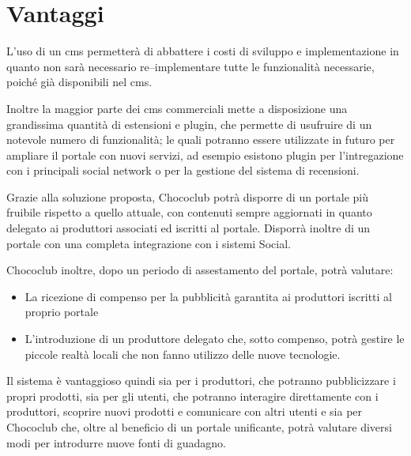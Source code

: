 
\section{Vantaggi} 
\label{sec:vantaggi}
L'uso di un \gls{cms} permetterà di abbattere i costi di sviluppo e implementazione in quanto non sarà necessario re--implementare tutte le funzionalità necessarie, poiché già disponibili nel \gls{cms}.

Inoltre la maggior parte dei \gls{cms} commerciali mette a disposizione una grandissima quantità di estensioni e plugin, che permette di usufruire di un notevole numero di funzionalità; le quali potranno essere utilizzate in futuro per ampliare il portale con nuovi servizi, ad esempio esistono plugin per l'intregazione con i principali social network o per la gestione del sistema di recensioni.

Grazie alla soluzione proposta, Chococlub potrà disporre di un portale più fruibile rispetto a quello attuale, con contenuti sempre aggiornati in quanto delegato ai produttori associati ed iscritti al portale. Disporrà inoltre di un portale con una completa integrazione con i sistemi Social. 

Chococlub inoltre, dopo un periodo di assestamento del portale, potrà valutare: 
\begin{itemize}
	\item La ricezione di compenso per la pubblicità garantita ai produttori iscritti al proprio portale
	\item L'introduzione di un produttore delegato che, sotto compenso, potrà gestire le piccole realtà locali che non fanno utilizzo delle nuove tecnologie.
\end{itemize}

Il sistema è vantaggioso quindi sia per i produttori, che potranno pubblicizzare i propri prodotti, sia per gli utenti, che potranno interagire direttamente con i produttori, scoprire nuovi prodotti e comunicare con altri utenti e sia per Chococlub che, oltre al beneficio di un portale unificante, potrà valutare diversi modi per introdurre nuove fonti di guadagno.


